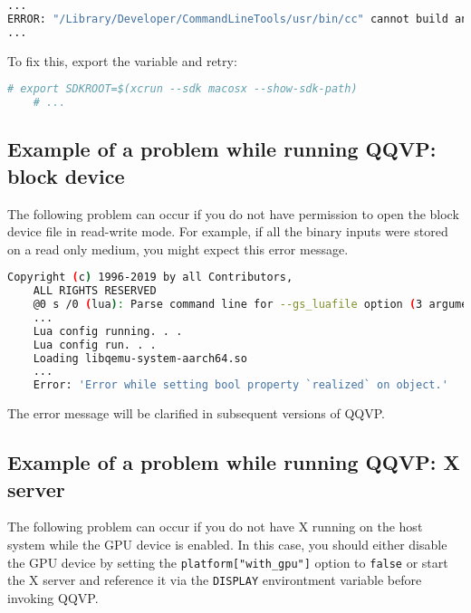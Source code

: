 \small
\begin{lstlisting}[language=bash]
    ...
ERROR: "/Library/Developer/CommandLineTools/usr/bin/cc" cannot build an executable (is your linker broken?)
...
\end{lstlisting}
\normalsize

To fix this, export the variable and retry:

\small
\begin{lstlisting}[language=bash]
    # export SDKROOT=$(xcrun --sdk macosx --show-sdk-path)
    # ...
\end{lstlisting}
\normalsize

\clearpage
\subsection{Example of a problem while running QQVP: block device}

The following problem can occur if you do not have permission to open the block device file in read-write mode. For example, if all the binary inputs were stored on a read only medium, you might expect this error message.

\small
\begin{lstlisting}[language=bash]
    Copyright (c) 1996-2019 by all Contributors,
    ALL RIGHTS RESERVED
    @0 s /0 (lua): Parse command line for --gs_luafile option (3 arguments)
    ...
    Lua config running. . .
    Lua config run. . .
    Loading libqemu-system-aarch64.so
    ...
    Error: 'Error while setting bool property `realized` on object.'
\end{lstlisting}
\normalsize

\note The error message will be clarified in subsequent versions of QQVP.

\subsection{Example of a problem while running QQVP: X server}
\label{sec:xServer}

The following problem can occur if you do not have X running on the host
system while the GPU device is enabled. In this case, you should either
disable the GPU device by setting the {\small{\lstinline!platform["with_gpu"]!}}
option to {\small{\lstinline!false!}} or start the X server and reference
it via the {\small{\lstinline!DISPLAY!}} environtment variable before invoking
QQVP.

